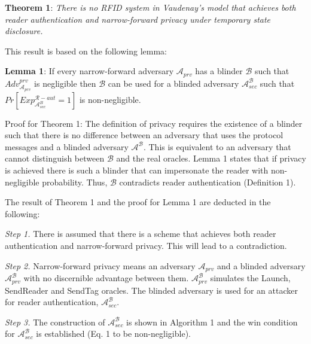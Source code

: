     \textbf{Theorem 1}: \textit{There is no RFID system in Vaudenay's model that achieves both reader authentication and narrow-forward privacy 
    under temporary state disclosure.}

    This result is based on the following lemma:

    \textbf{Lemma 1}: If every narrow-forward adversary $\mathcal{A}_{prv}$ has a blinder $\mathcal{B}$ such that $Adv_{\mathcal{A}_{prv}}^{prv}$ is negligible
    then $\mathcal{B}$ can be used for a blinded adversary $\mathcal{A}_{sec}^{\mathcal{B}}$ such that $Pr[Exp_{\mathcal{A}_{sec}^{B}}^{\mathcal{R}-aut} = 1]$ is
    non-negligible.

    Proof for Theorem 1: The definition of privacy requires the existence of a blinder such that there is no difference between an adversary that uses the 
    protocol messages and a blinded adversary $\mathcal{A}^{\mathcal{B}}$. This is equivalent to an adversary that cannot distinguish between $\mathcal{B}$
    and the real oracles. Lemma 1 states that if privacy is achieved there is such a blinder that can impersonate the reader with non-negligible probability.
    Thus, $\mathcal{B}$ contradicts reader authentication (Definition 1).

    The result of Theorem 1 and the proof for Lemma 1 are deducted in the following:

    \textit{Step 1.} There is assumed that there is a scheme that achieves both reader authentication and narrow-forward privacy. This will lead to a contradiction.
    
    \textit{Step 2.} Narrow-forward privacy means an adversary $\mathcal{A}_{prv}$ and a blinded adversary $\mathcal{A}_{prv}^{\mathcal{B}}$  with no discernible
    advantage between them. $\mathcal{A}_{prv}^{\mathcal{B}}$ simulates the Launch, SendReader and SendTag oracles.
    The blinded adversary is used for an attacker for reader authentication, $\mathcal{A}_{sec}^{\mathcal{B}}$.
    
    \textit{Step 3.} The construction of $\mathcal{A}_{sec}^{\mathcal{B}}$ is shown in Algorithm 1 and the win condition for $\mathcal{A}_{sec}^{\mathcal{B}}$
    is established (Eq. 1 to be non-negligible). 

